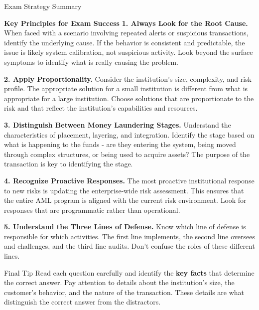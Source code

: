 \documentclass[8pt]{beamer}  %
\begin{document}
	\begin{frame}{Exam Strategy Summary}
		\begin{block}{\large \textbf{Key Principles for Exam Success}}
			\textbf{1. Always Look for the Root Cause.} When faced with a scenario involving repeated alerts or suspicious transactions, identify the underlying cause. If the behavior is consistent and predictable, the issue is likely system calibration, not suspicious activity. Look beyond the surface symptoms to identify what is really causing the problem.
			
			\textbf{2. Apply Proportionality.} Consider the institution's size, complexity, and risk profile. The appropriate solution for a small institution is different from what is appropriate for a large institution. Choose solutions that are proportionate to the risk and that reflect the institution's capabilities and resources.
			
			\textbf{3. Distinguish Between Money Laundering Stages.} Understand the characteristics of placement, layering, and integration. Identify the stage based on what is happening to the funds - are they entering the system, being moved through complex structures, or being used to acquire assets? The purpose of the transaction is key to identifying the stage.
			
			\textbf{4. Recognize Proactive Responses.} The most proactive institutional response to new risks is updating the enterprise-wide risk assessment. This ensures that the entire AML program is aligned with the current risk environment. Look for responses that are programmatic rather than operational.
			
			\textbf{5. Understand the Three Lines of Defense.} Know which line of defense is responsible for which activities. The first line implements, the second line oversees and challenges, and the third line audits. Don't confuse the roles of these different lines.
		\end{block}
		
		\vspace{0.2cm}
		\begin{alertblock}{Final Tip}
			Read each question carefully and identify the \textbf{key facts} that determine the correct answer. Pay attention to details about the institution's size, the customer's behavior, and the nature of the transaction. These details are what distinguish the correct answer from the distractors.
		\end{alertblock}
	\end{frame}
	
\end{document}
